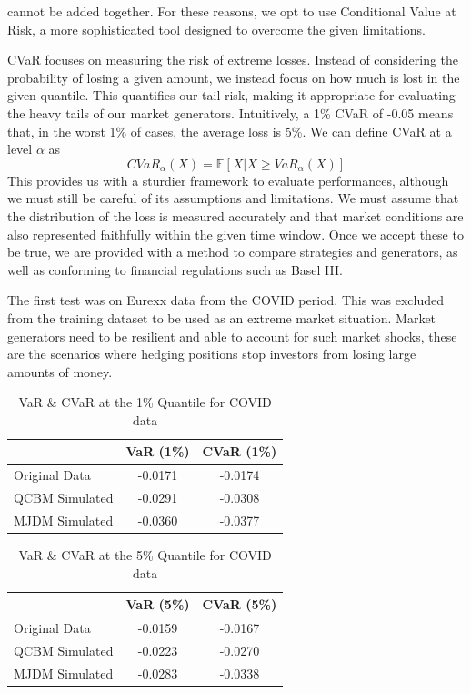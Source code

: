 \documentclass[12pt]{article}
\newcommand{\newp}
    {
    \vskip 0.5cm 
  }
\numberwithin{equation}{section}
\begin{document}
cannot be added together. For these reasons, we opt to use Conditional Value at 
Risk, a more sophisticated tool designed to overcome the given limitations. 
\newp 
CVaR focuses on measuring the risk of extreme losses. Instead of 
considering the probability of losing a given amount, we instead focus on how 
much is lost in the given quantile. This quantifies our tail risk, making it 
appropriate for evaluating the heavy tails of our market generators. Intuitively, 
a 1\% CVaR of -0.05 means that, in the worst 1\% of cases, the average loss is 5\%. 
We can define CVaR at a level $\alpha$ as 
\begin{equation}
  CVaR_{\alpha}(X) = \mathbb{E}[X | X \geq VaR_{\alpha}(X)]
\end{equation}
This provides us with a sturdier framework to evaluate performances, although we 
must still be careful of its assumptions and limitations. We must assume that the 
distribution of the loss is measured accurately and that market conditions are also 
represented faithfully within the given time window. Once we accept these to be 
true, we are provided with a method to compare strategies and generators, as well 
as conforming to financial regulations such as Basel III.
\newp 
The first test was on Eurexx data from the COVID period. This was excluded from the training 
dataset to be used as an extreme market situation. Market generators need to be 
resilient and able to account for such market shocks, these are the scenarios where 
hedging positions stop investors from losing large amounts of money.
\begin{table}[h!]
\centering
\begin{tabular}{lcc}
\hline
\textbf{} & \textbf{VaR (1\%)} & \textbf{CVaR (1\%)} \\
\hline
Original Data     & -0.0171 & -0.0174 \\
QCBM Simulated    & -0.0291 & -0.0308 \\
MJDM Simulated    & -0.0360 & -0.0377 \\
\hline
\end{tabular}
\caption{VaR \& CVaR at the 1\% Quantile for COVID data}
\label{tab:cvar_1}
\end{table}
\begin{table}[h!]
\centering
\begin{tabular}{lcc}
\hline
\textbf{} & \textbf{VaR (5\%)} & \textbf{CVaR (5\%)} \\
\hline
Original Data     & -0.0159 & -0.0167 \\
QCBM Simulated    & -0.0223 & -0.0270 \\
MJDM Simulated    & -0.0283 & -0.0338 \\
\hline
\end{tabular}
\caption{VaR \& CVaR at the 5\% Quantile for COVID data}
\label{tab:cvar_5}
\end{table}
\end{document}

